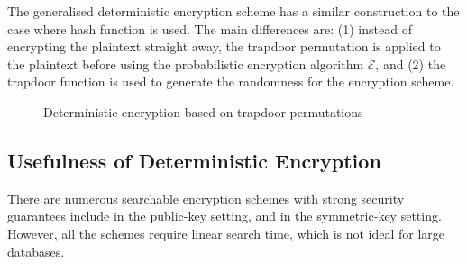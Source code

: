 The generalised deterministic encryption scheme has a similar construction to the case where hash function is used. The main differences are: (1) instead of encrypting the plaintext straight away, the trapdoor permutation is applied to the plaintext before using the probabilistic encryption algorithm $\mathcal{E}$, and (2) the trapdoor function is used to generate the randomness for the encryption scheme.

\begin{figure}[H]
\begin{pchstack}[center]
	
	\pchspace
	
	
	\pchspace
	
\end{pchstack}

\caption{Deterministic encryption based on trapdoor permutations}
\end{figure}



\subsection{Usefulness of Deterministic Encryption}
There are numerous searchable encryption schemes with strong security guarantees include \cite{Boneh2004, Golle2004, Abdalla2005, Baek2008, Boyen2006, Boneh2007} in the public-key setting, and \cite{Song:2000:PTS:882494.884426, goh03, Chang2005} in the symmetric-key setting. However, all the schemes require linear search time, which is not ideal for large databases.

